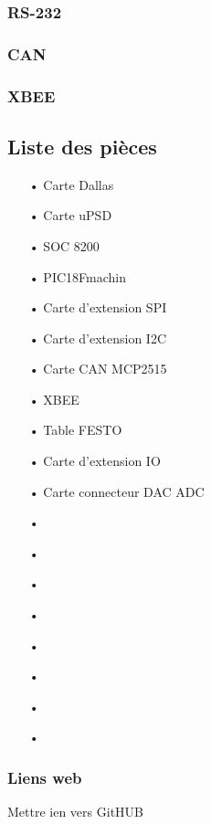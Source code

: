 \documentclass[10pt,a4paper,final]{article}
\begin{document}
\begin{spacing}{1.5}
\subsubsection{RS-232}

\subsubsection{CAN}

\subsubsection{XBEE}




\subsection{Liste des pièces}
\begin{center}
\HRule
\end{center}
\begin{multicols}{3}
\begin{itemize}
\item[•]Carte Dallas
\item[•]Carte uPSD
\item[•]SOC 8200
\item[•]PIC18Fmachin
\item[•]Carte d'extension SPI
\item[•]Carte d'extension I2C
\item[•]Carte CAN MCP2515
\item[•]XBEE
\item[•]Table FESTO
\item[•]Carte d'extension IO
\item[•]Carte connecteur DAC ADC
\item[•]
\item[•]
\item[•]
\item[•]
\item[•]
\item[•]
\item[•]
\item[•]
\end{itemize}
\end{multicols}
\begin{center}
\HRule
\end{center}

\subsubsection{Liens web}
Mettre ien vers GitHUB


\end{spacing}
\end{document}
